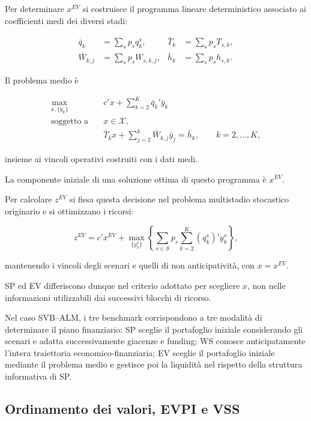 Per determinare $x^{EV}$ si costruisce
il programma lineare deterministico
associato ai coefficienti medi
dei diversi stadi:

\[
\begin{aligned}
\bar q_k
&=
\sum_s p_s q_k^s,
&
\bar T_k
&=
\sum_s p_s T_{s,k},
\\[4pt]
\bar W_{k,j}
&=
\sum_s p_s W_{s,k,j},
&
\bar h_k
&=
\sum_s p_s h_{s,k}.
\end{aligned}
\]

Il problema medio \`e

\[
\begin{aligned}
\max_{x,\{\bar y_k\}}
\quad&
c'x+\sum_{k=2}^{K}\bar q_k'\bar y_k
\\[4pt]
\text{soggetto a}\quad&
x\in\mathcal X,
\\[4pt]
&
\bar T_kx+
\sum_{j=2}^{k}\bar W_{k,j}\bar y_j
=
\bar h_k,
\qquad k=2,\ldots,K,
\end{aligned}
\]

insieme ai vincoli operativi costruiti
con i dati medi.

La componente iniziale di una soluzione
ottima di questo programma \`e $x^{EV}$.

Per calcolare $z^{EV}$ si fissa
questa decisione nel problema
multistadio stocastico originario
e si ottimizzano i ricorsi:

\[
z^{EV}
=
c'x^{EV}
+
\max_{\{y_k^s\}}
\left\{
\sum_{s\in\mathcal S}p_s
\sum_{k=2}^{K}(q_k^s)'y_k^s
\right\},
\]

mantenendo i vincoli degli scenari
e quelli di non anticipativit\`a,
con $x=x^{EV}$.

SP ed EV differiscono dunque
nel criterio adottato per scegliere
$x$, non nelle informazioni utilizzabili
dai successivi blocchi di ricorso.

\medskip

Nel caso SVB--ALM, i tre benchmark
corrispondono a tre modalit\`a
di determinare il piano finanziario:
SP sceglie il portafoglio iniziale
considerando gli scenari e adatta
successivamente giacenze e funding;
WS conosce anticipatamente
l'intera traiettoria economico-finanziaria;
EV sceglie il portafoglio iniziale
mediante il problema medio e gestisce
poi la liquidit\`a nel rispetto
della struttura informativa di SP.

\subsection{Ordinamento dei valori, EVPI e VSS}

